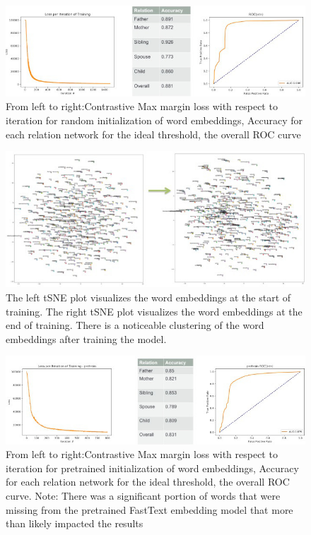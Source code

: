 \documentclass[11.5pt]{article}
\newcounter{graphics}
\begin{document}
\begin{figure}[h!]
\centerline{\includegraphics[width=1\textwidth]{report_ntn/performanceRandomNtn.jpg}}
  \caption{From left to right:Contrastive Max margin loss with respect to iteration for random initialization of word embeddings, Accuracy for each relation network for the ideal threshold, the overall ROC curve}
\label{performanceRandomNtn.jpg}
\end{figure}

\begin{figure}[h!]
\centerline{\includegraphics[width=1\textwidth]{report_ntn/random_init_tsne.jpg}}
  \caption{The left tSNE plot visualizes the word embeddings at the start of training. The right tSNE plot visualizes the word embeddings at the end of training. There is a noticeable clustering of the word embeddings after training the model.}
\label{random_init_tsne.jpg}
\end{figure}

\begin{figure}[h!]
\centerline{\includegraphics[width=1\textwidth]{report_ntn/pretrain_perf.jpg}}
  \caption{From left to right:Contrastive Max margin loss with respect to iteration for pretrained initialization of word embeddings, Accuracy for each relation network for the ideal threshold, the overall ROC curve. Note: There was a significant portion of words that were missing from the pretrained FastText embedding model that more than likely impacted the results}
\label{pretrain_perf.jpg}
\end{figure}
\end{document}
